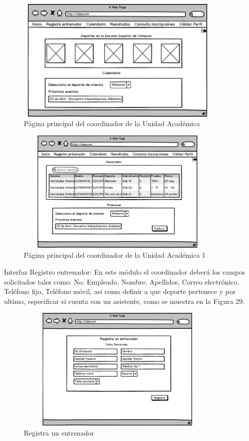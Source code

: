	\begin{figure}[hbt!]
		\centering
		\includegraphics[width=10cm, height=6cm]{Imagenes/Disenos/IniciocoordinadorUA.png}
		\caption{Página principal del coordinador de la Unidad Académica}
	\end{figure}
	
	\pagebreak
	
	\begin{figure}[hbt!]
		\centering
		\includegraphics[width=10cm, height=6cm]{Imagenes/Disenos/IniciocoordinadorUA1.png}
		\caption{Página principal del coordinador de la Unidad Académica 1}
	\end{figure}
	
	Interfaz Registro entrenador: En este  módulo el coordinador deberá los campos solicitados tales como: No. Empleado, Nombre, Apellidos, Correo electrónico, Teléfono fijo, Teléfono móvil, asi como definir a que deporte pertenece y por ultimo, especificar si cuenta con un asistente, como se muestra en la Figura 29.
	\begin{figure}[hbt!]
		\centering
		\includegraphics[width=10cm, height=6cm]{Imagenes/Disenos/Registraunentrenador.png}
		\caption{Registra un entrenador}
	\end{figure}
	
